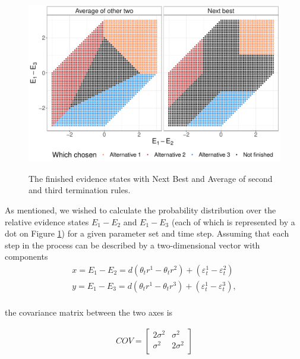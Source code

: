 \documentclass[11pt,a4paper]{article}
\begin{document}
\begin{figure}
\captionsetup{justification=centering}
\centering
\caption{The finished evidence states with Next Best and Average of second and third termination rules.}
\includegraphics[width=1\textwidth]{rulesfinished.pdf}
\label{fig:rulesfinished}
\end{figure}

As mentioned, we wished to calculate the probability distribution over the relative evidence states $E_{1}-E_{2}$ and $E_{1}-E_{3}$ (each of which is represented by a dot on Figure \ref{fig:rulesfinished}) for a given parameter set and time step. Assuming that each step in the process can be described by a two-dimensional vector with components
\begin{equation}
\begin{array}{l}
\displaystyle x = E_{1}-E_{2} = d(\theta_{t}r^1-\theta_{t}r^2) + (\varepsilon_{t}^{1}-\varepsilon_{t}^{2})\\
\displaystyle y = E_{1}-E_{3} = d(\theta_{t}r^1-\theta_{t}r^3) + (\varepsilon_{t}^{1}-\varepsilon_{t}^{3}),\\
\end{array} 
\label{eq:axes1}
\end{equation}

the covariance matrix between the two axes is

\begin{equation}
\begin{array}{l}
COV = \begin{bmatrix}
       2\sigma^2 & \sigma^2 \\[0.3em]
       \sigma^2 & 2\sigma^2 \\[0.3em]
     \end{bmatrix}
\end{array} 
\label{eq:covariance}
\end{equation}
\end{document}
